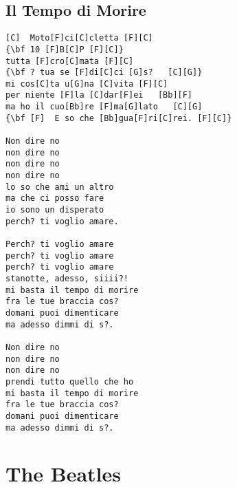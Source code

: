\documentclass[a4paper]{article}
\begin{document}
\subsection{Il Tempo di Morire} %
\label{sub:Il Tempo di Morire}
\begin{Verbatim}[commandchars=\\\{\}]
[C]  Moto[F]ci[C]cletta [F][C]
{\bf 10 [F]B[C]P [F][C]}
tutta [F]cro[C]mata [F][C]
{\bf ? tua se [F]di[C]ci [G]s?   [C][G]}
mi cos[C]ta u[G]na [C]vita [F][C]
per niente [F]la [C]dar[F]ei   [Bb][F]
ma ho il cuo[Bb]re [F]ma[G]lato   [C][G]
{\bf [F]  E so che [Bb]gua[F]ri[C]rei. [F][C]}

Non dire no
non dire no
non dire no
non dire no
lo so che ami un altro
ma che ci posso fare
io sono un disperato
perch? ti voglio amare.

Perch? ti voglio amare
perch? ti voglio amare
perch? ti voglio amare
stanotte, adesso, siiii?!
mi basta il tempo di morire
fra le tue braccia cos?
domani puoi dimenticare
ma adesso dimmi di s?.

Non dire no
non dire no
non dire no
prendi tutto quello che ho
mi basta il tempo di morire
fra le tue braccia cos?
domani puoi dimenticare
ma adesso dimmi di s?.
\end{Verbatim}
\newpage
\section{The Beatles} %
\label{sec:The Beatles}
\end{document}
